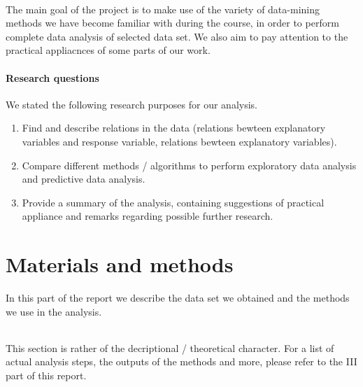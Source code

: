 \documentclass[10pt]{article}\usepackage[]{graphicx}\usepackage[]{color}
\begin{document}
\paragraph{}
The main goal of the project is to make use of the variety of data-mining methods we have become familiar with during the course, in order to perform complete data analysis of selected data set. We also aim to pay attention to the practical appliacnces of some parts of our work. 

\subsection{Research questions}

We stated the following research purposes for our analysis. 
\begin{enumerate}
\item Find and describe relations in the data (relations bewteen explanatory variables and response variable, relations bewteen explanatory variables). 
\item Compare different methods / algorithms to perform exploratory data analysis and predictive data analysis. 
\item Provide a summary of the analysis, containing suggestions of practical appliance and remarks regarding possible further research.  
\end{enumerate}







\clearpage
\part{Materials and methods}

In this part of the report we describe the data set we obtained and the methods we use in the analysis. 

\paragraph{}
This section is rather of the decriptional / theoretical character. For a list of actual analysis steps, the outputs of the methods and more, please refer to the III part of this report.  
\end{document}
